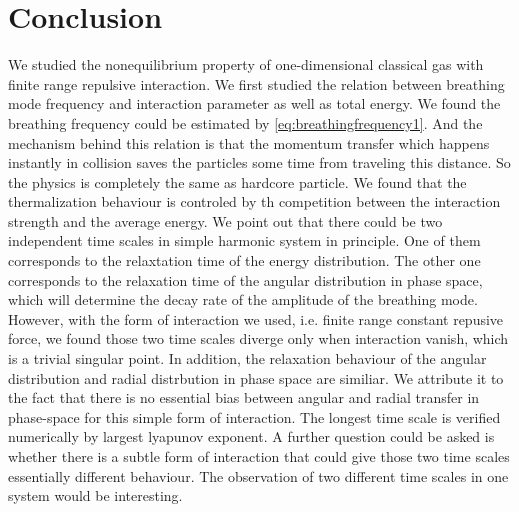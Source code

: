\documentclass[aps,pre,twocolumn,groupedaddress]{revtex4-1}
\begin{document}
\section{Conclusion}
We studied the nonequilibrium property of one-dimensional classical gas with finite range repulsive interaction. We first studied the relation between breathing mode frequency and interaction parameter as well as total energy. We found the breathing frequency could be estimated by \ref{eq:breathingfrequency1}. And the mechanism behind this relation is that the momentum transfer which happens instantly in collision saves the particles some time from traveling this distance. So the physics is completely the same as hardcore particle.
We found that the thermalization behaviour is controled by th competition between the interaction strength and the average energy. We point out that there could be two independent time scales in simple harmonic system in principle. One of them corresponds to the relaxtation time of the energy distribution. The other one corresponds to the relaxation time of the angular distribution in phase space, which will determine the decay rate of the amplitude of the breathing mode. However, with the form of interaction we used, i.e. finite range constant repusive force, we found those two time scales diverge only when interaction vanish, which is a trivial singular point. In addition, the relaxation behaviour of the angular distribution and radial distrbution in phase space are similiar. We attribute it to the fact that there is no essential bias between angular and radial transfer in phase-space for this simple form of interaction. The longest time scale is verified numerically by largest lyapunov exponent. A further question could be asked is whether there is a subtle form of interaction that could give those two time scales essentially different behaviour. The observation of two different time scales in one system would be interesting.
\end{document}
